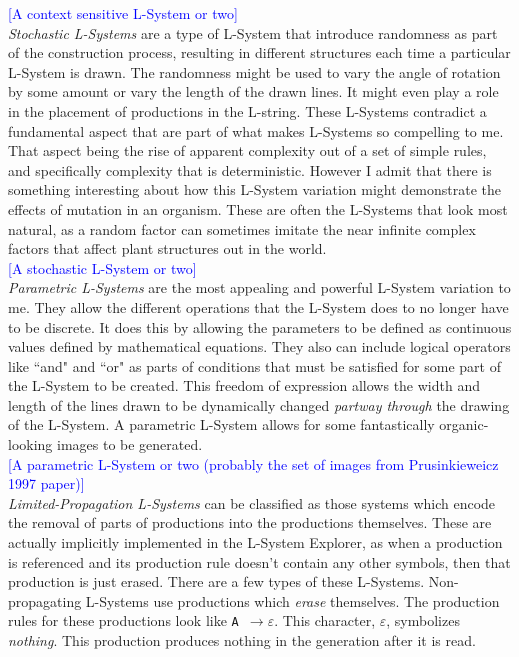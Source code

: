 \documentclass[12pt,twoside]{reedthesis}
\newcommand{\code}[1]{\texttt{#1}}
\begin{document}
	\textcolor{blue}{[A context sensitive L-System or two]}\\
	
	\textit{Stochastic L-Systems} are a type of L-System that introduce randomness as part of the construction process, resulting in different structures each time a particular L-System is drawn. The randomness might be used to vary the angle of rotation by some amount or vary the length of the drawn lines. It might even play a role in the placement of productions in the L-string. These L-Systems contradict a fundamental aspect that are part of what makes L-Systems so compelling to me. That aspect being the rise of apparent complexity out of a set of simple rules, and specifically complexity that is deterministic. However I admit that there is something interesting about how this L-System variation might demonstrate the effects of mutation in an organism. These are often the L-Systems that look most natural, as a random factor can sometimes imitate the near infinite complex factors that affect plant structures out in the world.\\
	
	\textcolor{blue}{[A stochastic L-System or two]}\\
	
	\textit{Parametric L-Systems} are the most appealing and powerful L-System variation to me. They allow the different operations that the L-System does to no longer have to be discrete. It does this by allowing the parameters to be defined as continuous values defined by mathematical equations. They also can include logical operators like ``and" and ``or" as parts of conditions that must be satisfied for some part of the L-System to be created. This freedom of expression allows the width and length of the lines drawn to be dynamically changed \textit{partway through} the drawing of the L-System. A parametric L-System allows for some fantastically organic-looking images to be generated.\\
	
	\textcolor{blue}{[A parametric L-System or two (probably the set of images from Prusinkieweicz 1997 paper)]}\\
	
	\textit{Limited-Propagation L-Systems} can be classified as those systems which encode the removal of parts of productions into the productions themselves. These are actually implicitly implemented in the L-System Explorer, as when a production is referenced and its production rule doesn't contain any other symbols, then that production is just erased. There are a few types of these L-Systems. Non-propagating L-Systems use productions which \textit{erase} themselves. The production rules for these productions look like \code{A $\rightarrow \varepsilon$}. This character, $\varepsilon$, symbolizes \textit{nothing}. This production produces nothing in the generation after it is read. \\
	
\end{document}
